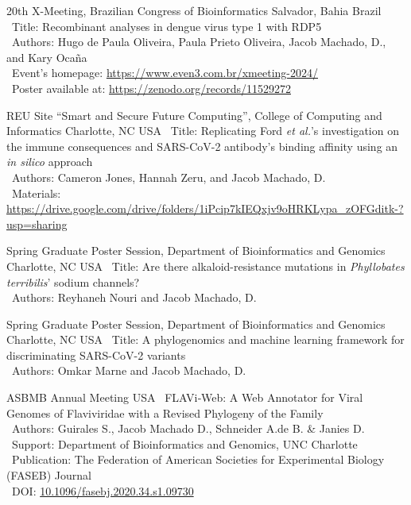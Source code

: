 \documentclass[11pt, letterpaper, sans]{moderncv}
\begin{document}
    {20th X-Meeting, Brazilian Congress of Bioinformatics}
    {Salvador, Bahia}
    {Brazil}
    {}
    {
        \textbullet~Title: Recombinant analyses in dengue virus type 1 with RDP5\\
        \textbullet~Authors: Hugo de Paula Oliveira, Paula Prieto Oliveira, Jacob Machado, D., and Kary Ocaña\\
        \textbullet~Event's homepage: \url{https://www.even3.com.br/xmeeting-2024/}\\
        \textbullet~Poster available at: \url{https://zenodo.org/records/11529272}
    }

    {REU Site ``Smart and Secure Future Computing'', College of Computing and Informatics}
    {Charlotte, NC}
    {USA}
    {}
    {
        \textbullet~Title: Replicating Ford \textit{et al.}'s investigation on the immune consequences and SARS-CoV-2 antibody's binding affinity using an \textit{in silico} approach\\
        \textbullet~Authors: Cameron Jones, Hannah Zeru, and Jacob Machado, D.\\
        \textbullet~Materials: \url{https://drive.google.com/drive/folders/1iPcip7kIEQxjv9oHRKLypa_zOFGditk-?usp=sharing}
    }

    {Spring Graduate Poster Session, Department of Bioinformatics and Genomics}
    {Charlotte, NC}
    {USA}
    {}
    {
        \textbullet~Title: Are there alkaloid-resistance mutations in \textit{Phyllobates terribilis}' sodium channels?\\
        \textbullet~Authors: Reyhaneh Nouri and Jacob Machado, D.
    }

\cventry{---}
    {Spring Graduate Poster Session, Department of Bioinformatics and Genomics}
    {Charlotte, NC}
    {USA}
    {}
    {
        \textbullet~Title: A phylogenomics and machine learning framework for discriminating SARS-CoV-2 variants\\
        \textbullet~Authors: Omkar Marne and Jacob Machado, D.
    }

	{ASBMB Annual Meeting}
	{}
	{USA}
	{}
	{
		\textbullet~FLAVi‐Web: A Web Annotator for Viral Genomes of Flaviviridae with a Revised Phylogeny of the Family\\
		\textbullet~Authors: Guirales S.,  Jacob Machado D.,  Schneider A.de B. \&  Janies D.\\
		\textbullet~Support: Department of Bioinformatics and Genomics,  UNC Charlotte\\
		\textbullet~Publication: The Federation of American Societies for Experimental Biology (FASEB) Journal\\
		\textbullet~DOI: \href{https://doi.org/10.1096/fasebj.2020.34.s1.09730}{10.1096/fasebj.2020.34.s1.09730}
	}
\end{document}
